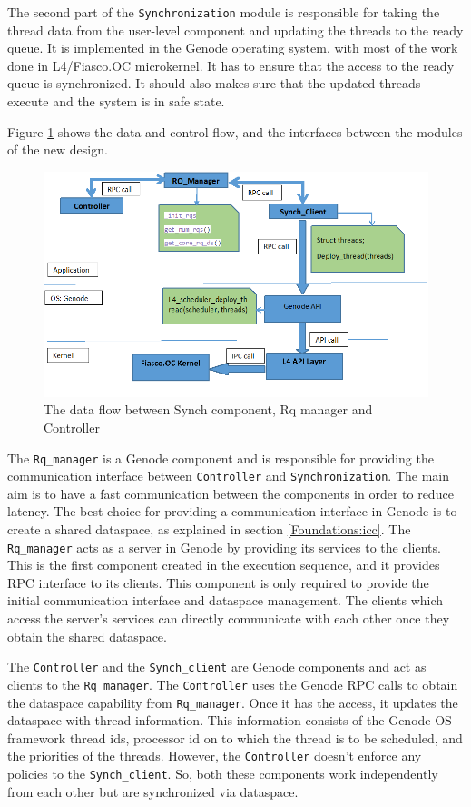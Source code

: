 The second part of the \texttt{Synchronization} module is responsible for taking the thread data from the user-level component and updating the threads to the ready queue. It is implemented in the Genode operating system, with most of the work done in L4/Fiasco.OC microkernel. It has to ensure that the access to the ready queue is synchronized. It should also makes sure that the updated threads execute and the system is in safe state.

Figure \ref{fig:Design_25} shows the data and control flow, and the interfaces between the modules of the new design.

\begin{figure}[h]
\centering
\includegraphics[width=1.0\linewidth]{figures/Design_25.png}
\caption{The data flow between Synch component, Rq manager and Controller}
\label{fig:Design_25}
\end{figure}

The \texttt{Rq\_manager} is a Genode component and is responsible for providing the communication interface between \texttt{Controller} and \texttt{Synchronization}. The main aim is to have a fast communication between the components in order to reduce latency. The best choice for providing a communication interface in Genode is to create a shared dataspace, as explained in section \ref{Foundations:icc}. The \texttt{Rq\_manager} acts as a server in Genode by providing its services to the clients. This is the first component created in the execution sequence, and it provides RPC interface to its clients. This component is only required to provide the initial communication interface and dataspace management. The clients which access the server's services can directly communicate with each other once they obtain the shared dataspace. 

The \texttt{Controller} and the \texttt{Synch\_client} are Genode components and act as clients to the \texttt{Rq\_manager}. The \texttt{Controller} uses the Genode RPC calls to obtain the dataspace capability from \texttt{Rq\_manager}. Once it has the access, it updates the dataspace with thread information. This information consists of the Genode OS framework thread ids, processor id on to which the thread is to be scheduled, and the priorities of the threads. However, the \texttt{Controller} doesn't enforce any policies to the \texttt{Synch\_client}. So, both these components work independently from each other but are synchronized via dataspace.

